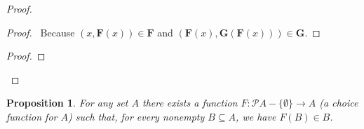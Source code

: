 \documentclass{book}
\let\qed\relax
\newtheorem{prop}[ax]{Proposition}
\theoremstyle{definition}
\begin{document}
\begin{proof}
\pf
{}
\begin{proof}
	\pf\ Because $(x, \mathbf{F}(x)) \in \mathbf{F}$ and $(\mathbf{F}(x), \mathbf{G}(\mathbf{F}(x))) \in \mathbf{G}$.
\end{proof}
\begin{proof}
\end{proof}
\qed
\end{proof}

\begin{prop}
For any set $A$ there exists a function $F : \mathcal{P} A - \{ \emptyset \} \rightarrow A$ (a \emph{choice function} for $A$) such that, for every nonempty $B \subseteq A$, we have $F(B) \in B$.
\end{prop}
\end{document}

